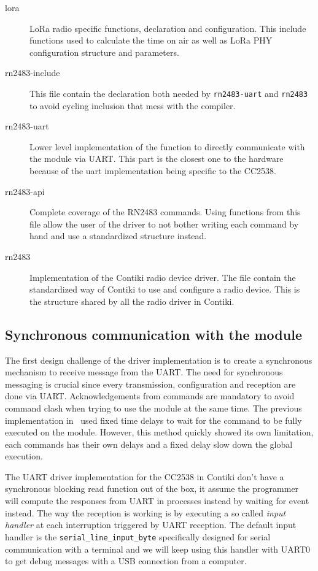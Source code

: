 \begin{description}
  \item[lora] LoRa radio specific functions, declaration and configuration. This
    include functions used to calculate the time on air as well as
    LoRa PHY configuration structure and parameters.
  \item[rn2483-include] This file contain the declaration both needed by
    \lstinline{rn2483-uart} and \lstinline{rn2483} to avoid cycling inclusion
    that mess with the compiler.
  \item[rn2483-uart] Lower level implementation of the function to directly
    communicate with the module via UART\@. This part is the closest one to the
    hardware because of the uart implementation being specific to the CC2538.
  \item[rn2483-api] Complete coverage of the RN2483 commands. Using functions
    from this file allow the user of the driver to not bother writing
    each command by hand and use a standardized structure instead.
  \item[rn2483] Implementation of the Contiki radio device driver. The file
    contain the standardized way of Contiki to use and configure a radio device.
    This is the structure shared by all the radio driver in Contiki.
\end{description}

\subsection{Synchronous communication with the module}

The first design challenge of the driver implementation is to create a
synchronous mechanism to receive message from the UART\@. 
The need for synchronous messaging is crucial since every
transmission, configuration and reception are done via UART\@.
Acknowledgements from commands are mandatory to avoid command
clash when trying to use the module at the same time.
The previous implementation in~\cite{8847137} used fixed time delays to 
wait for the command to be fully executed on the module. However, this method 
quickly showed its own limitation, each commands has their own delays and a
fixed delay slow down the global execution.


The UART driver implementation for the CC2538 in Contiki don't have a synchronous 
blocking read function out of the box, it assume the programmer will compute the
responses from UART in processes instead by waiting for event instead.
The way the reception is working is by executing a so called \emph{input handler} 
at each interruption triggered by UART reception.
The default input handler is the \lstinline{serial_line_input_byte} 
specifically designed for serial communication with a terminal and we will keep
using this handler with UART0 to get debug messages with a USB connection from 
a computer.

